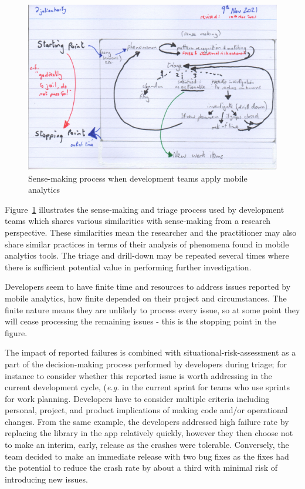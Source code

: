 \begin{figure}
    \centering
    \includegraphics[width=\linewidth]{images/rough-sketches/practical-sense-making-process-10-nov-2021.jpeg}
    \caption{Sense-making process when development teams apply mobile analytics}
    \label{fig:practical-sense-making-process-when-dev-teams-apply-mobile-analytics}
\end{figure}


Figure~\ref{fig:practical-sense-making-process-when-dev-teams-apply-mobile-analytics} illustrates the sense-making and triage process used by development teams which shares various similarities with sense-making from a research perspective. These similarities mean the researcher and the practitioner may also share similar practices in terms of their analysis of phenomena found in mobile analytics tools. The triage and drill-down may be repeated several times where there is sufficient potential value in performing further investigation.

Developers seem to have finite time and resources to address issues reported by mobile analytics, how finite depended on their project and circumstances. The finite nature means they are unlikely to process every issue, so at some point they will cease processing the remaining issues - this is the stopping point in the figure.

The impact of reported failures is combined with situational-risk-assessment as a part of the decision-making process performed by developers during triage; for instance to consider whether this reported issue is worth addressing in the current development cycle, (\emph{e.g.} in the current sprint for teams who use sprints for work planning. Developers have to consider multiple criteria including personal, project, and product implications of making code and/or operational changes. From the same  example, the developers addressed high failure rate by replacing the  library in the app relatively quickly, however they then choose not to make an interim, early, release as the crashes were tolerable. Conversely, the  team decided to make an immediate release with two bug fixes as the fixes had the potential to reduce the crash rate by about a third with minimal risk of introducing new issues. 

